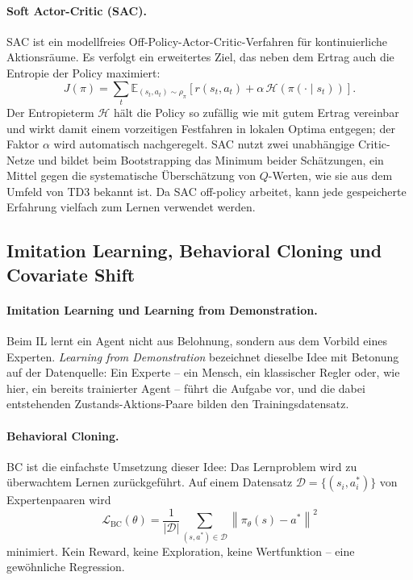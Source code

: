 \paragraph{Soft Actor-Critic (SAC).}
\ac{SAC} \cite{haarnoja2018soft} ist ein modellfreies Off-Policy-Actor-Critic-Verfahren für kontinuierliche Aktionsräume. Es verfolgt ein erweitertes Ziel, das neben dem Ertrag auch die Entropie der Policy maximiert:
\begin{equation}
  J(\pi) = \sum_{t} \mathbb{E}_{(s_t, a_t) \sim \rho_\pi} \left[ r(s_t, a_t) + \alpha\, \mathcal{H}\!\left( \pi(\cdot \mid s_t) \right) \right].
  \label{eq:sac}
\end{equation}
Der Entropieterm $\mathcal{H}$ hält die Policy so zufällig wie mit gutem Ertrag vereinbar und wirkt damit einem vorzeitigen Festfahren in lokalen Optima entgegen; der Faktor $\alpha$ wird automatisch nachgeregelt. \ac{SAC} nutzt zwei unabhängige Critic-Netze und bildet beim Bootstrapping das Minimum beider Schätzungen, ein Mittel gegen die systematische Überschätzung von $Q$-Werten, wie sie aus dem Umfeld von \ac{TD3} \cite{fujimoto2018addressing} bekannt ist. Da \ac{SAC} off-policy arbeitet, kann jede gespeicherte Erfahrung vielfach zum Lernen verwendet werden.

\subsection{Imitation Learning, Behavioral Cloning und Covariate Shift}
\label{subsec:il}

\paragraph{Imitation Learning und Learning from Demonstration.}
Beim \acf{IL} lernt ein Agent nicht aus Belohnung, sondern aus dem Vorbild eines Experten. \emph{Learning from Demonstration} bezeichnet dieselbe Idee mit Betonung auf der Datenquelle: Ein Experte -- ein Mensch, ein klassischer Regler oder, wie hier, ein bereits trainierter Agent -- führt die Aufgabe vor, und die dabei entstehenden Zustands-Aktions-Paare bilden den Trainingsdatensatz.

\paragraph{Behavioral Cloning.}
\acf{BC} ist die einfachste Umsetzung dieser Idee: Das Lernproblem wird zu überwachtem Lernen zurückgeführt. Auf einem Datensatz $\mathcal{D} = \{(s_i, a_i^{*})\}$ von Expertenpaaren wird
\begin{equation}
  \mathcal{L}_{\text{BC}}(\theta) = \frac{1}{|\mathcal{D}|} \sum_{(s, a^{*}) \in \mathcal{D}} \left\| \pi_\theta(s) - a^{*} \right\|^2
  \label{eq:bc}
\end{equation}
minimiert. Kein Reward, keine Exploration, keine Wertfunktion -- eine gewöhnliche Regression.

